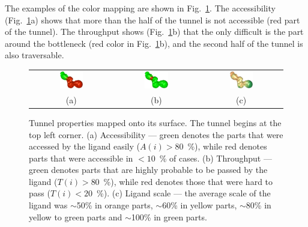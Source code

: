 \documentclass[usletter, 10pt, conference]{ieeeconf} %
\newcommand{\tylde}{$\sim$}
\begin{document}
The examples of the color mapping are shown in Fig.~\ref{fig:properties}.
The accessibility (Fig.~\ref{fig:properties}a) shows that more than the half of the tunnel is not accessible (red part of the tunnel).
The throughput shows (Fig.~\ref{fig:properties}b) that the only difficult is the part around the bottleneck (red color in Fig.~\ref{fig:properties}b), and the second half of the tunnel is also traversable.

\begin{figure}[h]
\centering
\begin{tabular}{ccc}
\includegraphics[width=0.3\textwidth]{fig/accessibility} &
\includegraphics[width=0.3\textwidth]{fig/throughput} &
\includegraphics[width=0.3\textwidth]{fig/ligand-scale} \\
  (a) & (b) & (c) \\                     
\end{tabular}
\caption{Tunnel properties mapped onto its surface. The tunnel begins at the top left corner.
(a) Accessibility --- green denotes the parts that were accessed by the ligand easily ($A(i) > 80$~\%), 
    while red denotes parts that were accessible  in $<10$~\% of cases.
(b) Throughput --- green denotes parts that are highly probable to be passed by the ligand ($T(i) > 80$~\%), 
    while red denotes those that were hard to pass ($T(i) < 20$~\%).
(c) Ligand scale --- the average scale of the ligand was \tylde 50\% in orange parts, \tylde 60\% in yellow parts, \tylde 80\% in yellow to green parts and \tylde 100\% in green parts.
\label{fig:properties}
}
\end{figure}
\end{document}
